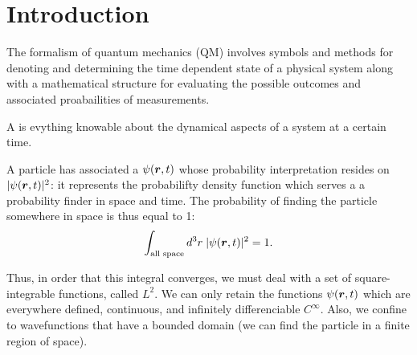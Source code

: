 \section{Introduction}

The formalism of quantum mechanics (QM) involves symbols and methods for denoting and determining the time dependent state of a physical system along with 
a mathematical structure for evaluating the possible outcomes and associated proabailities of measurements.

\begin{definition}[State]
    A  is evything knowable about the dynamical aspects of a system at a certain time.
\end{definition}

A particle has associated a  $\psi(\bm{r},t)$ whose probability interpretation resides on $|\psi(\bm{r},t)|^2$: it 
represents the probabilifty density function which serves a a probability finder in space and time. The probability of finding 
the particle somewhere in space is thus equal to 1:
\begin{align}
    \int_{\text{all space}}d^3r\;|\psi(\bm{r},t)|^2=1.
\end{align}

Thus, in order that this integral converges, we must deal with a set of square-integrable functions, called $L^2$. We can only 
retain the functions $\psi(\bm{r},t)$ which are everywhere defined, continuous, and infinitely differenciable $C^\infty$.
Also, we confine to wavefunctions that have a bounded domain (we can find the particle in a finite region of space).

